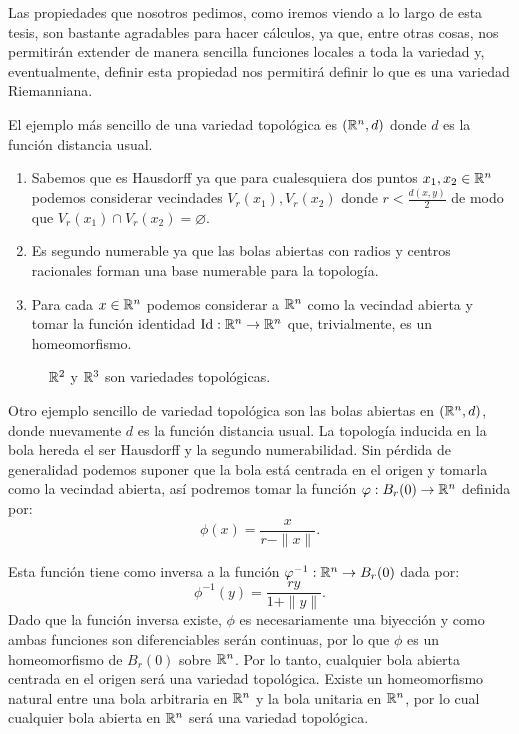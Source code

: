 Las propiedades que nosotros pedimos, como iremos viendo a lo largo de esta tesis, son bastante agradables para hacer cálculos, ya que, entre otras cosas, nos permitirán extender de manera sencilla funciones locales a toda la variedad y, eventualmente, definir esta propiedad nos permitirá definir lo que es una variedad Riemanniana.


\begin{example}\label{Ex: Variedad Topologica - Espacios Euclidianos}
	El ejemplo más sencillo de una variedad topológica es $(\mathbb{R}^n,d)$ donde $d$ es la función distancia usual.
	\begin{enumerate}
		\item Sabemos que es Hausdorff ya que para cualesquiera dos puntos $x_1,x_2 \in \mathbb{R}^n$ podemos considerar vecindades $V_r(x_1), V_r(x_2)$ donde $r < \frac{d(x,y)}{2}$ de modo que $V_r(x_1) \cap V_r(x_2) = \varnothing$.
		\item Es segundo numerable ya que las bolas abiertas con radios y centros racionales forman una base numerable para la topología.
		\item Para cada $x \in \mathbb{R}^n$ podemos considerar a $\mathbb{R}^n$ como la vecindad abierta y tomar la función identidad $\mathrm{Id}: \mathbb{R}^n \to \mathbb{R}^n$ que, trivialmente, es un homeomorfismo.
	\end{enumerate}
\end{example}

\begin{figure}[h]
	\centering
	
	\caption{$\mathbb{R}^2$ y $\mathbb{R}^3$ son variedades topológicas.}
\end{figure}

\begin{example}\label{Ex: Variedad Topologica - Bolas Abiertas}
	Otro ejemplo sencillo de variedad topológica son las bolas abiertas en $(\mathbb{R}^n,d)$, donde nuevamente $d$ es la función distancia usual. La topología inducida en la bola hereda el ser Hausdorff y la segundo numerabilidad. Sin pérdida de generalidad podemos suponer que la bola está centrada en el origen y tomarla como la vecindad abierta, así podremos tomar la función $\varphi: B_r(0) \to \mathbb{R}^n$ definida por:
	\[
		\phi(x) = \frac{x}{r - \|x\|}.
	\]

	Esta función tiene como inversa a la función $\varphi^{-1}: \mathbb{R}^n \to B_r(0)$ dada por:
	\[ \phi^{-1}(y) = \frac{ry}{1 + \|y\|}.
	\]
  Dado que la función inversa existe, $\phi$ es necesariamente una biyección y como ambas funciones son diferenciables serán continuas, por lo que $\phi$ es un homeomorfismo de $B_r(0)$ sobre $\mathbb{R}^n$. Por lo tanto, cualquier bola abierta centrada en el origen será una variedad topológica. Existe un homeomorfismo natural entre una bola arbitraria en $\mathbb{R}^n$ y la bola unitaria en $\mathbb{R}^n$, por lo cual cualquier bola abierta en $\mathbb{R}^n$ será una variedad topológica.
\end{example}

